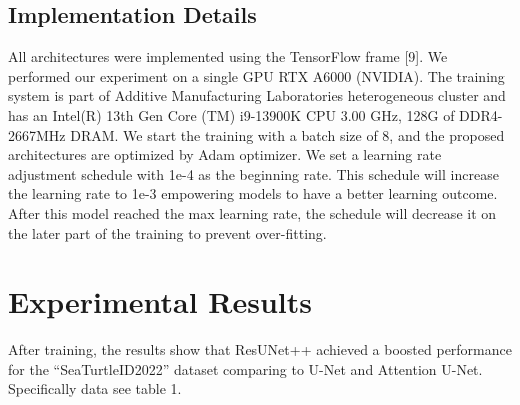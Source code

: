 \documentclass[conference]{IEEEtran}
\begin{document}
\subsection{Implementation Details}
All architectures were implemented using the TensorFlow frame [9]. We performed our experiment on a single GPU RTX A6000 (NVIDIA). The training system is part of Additive Manufacturing Laboratories heterogeneous cluster and has an Intel(R) 13th Gen Core (TM) i9-13900K CPU 3.00 GHz, 128G of DDR4-2667MHz DRAM. We start the training with a batch size of 8, and the proposed architectures are optimized by Adam optimizer. We set a learning rate adjustment schedule with 1e-4 as the beginning rate. This schedule will increase the learning rate to 1e-3 empowering models to have a better learning outcome. After this model reached the max learning rate, the schedule will decrease it on the later part of the training to prevent over-fitting.
\section{Experimental Results}
After training, the results show that ResUNet++ achieved a boosted performance for the “SeaTurtleID2022” dataset comparing to U-Net and Attention U-Net. Specifically data see table 1.
\end{document}
